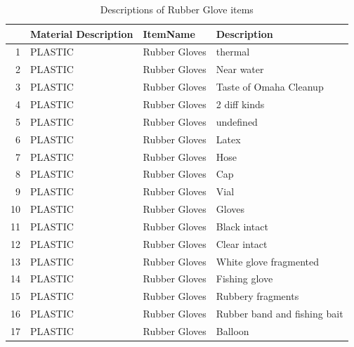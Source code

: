 \documentclass[10pt]{article}\usepackage[]{graphicx}\usepackage[]{color}
\begin{document}
\begin{table}[ht]
\centering
\begin{tabular}{rlll}
  \hline
 & Material Description & ItemName & Description \\ 
  \hline
1 & PLASTIC & Rubber Gloves & thermal \\ 
  2 & PLASTIC & Rubber Gloves & Near water \\ 
  3 & PLASTIC & Rubber Gloves & Taste of Omaha Cleanup \\ 
  4 & PLASTIC & Rubber Gloves & 2 diff kinds \\ 
  5 & PLASTIC & Rubber Gloves & undefined \\ 
  6 & PLASTIC & Rubber Gloves & Latex \\ 
  7 & PLASTIC & Rubber Gloves & Hose \\ 
  8 & PLASTIC & Rubber Gloves & Cap \\ 
  9 & PLASTIC & Rubber Gloves & Vial \\ 
  10 & PLASTIC & Rubber Gloves & Gloves \\ 
  11 & PLASTIC & Rubber Gloves & Black intact \\ 
  12 & PLASTIC & Rubber Gloves & Clear intact \\ 
  13 & PLASTIC & Rubber Gloves & White glove fragmented \\ 
  14 & PLASTIC & Rubber Gloves & Fishing glove \\ 
  15 & PLASTIC & Rubber Gloves & Rubbery fragments \\ 
  16 & PLASTIC & Rubber Gloves & Rubber band and fishing bait \\ 
  17 & PLASTIC & Rubber Gloves & Balloon \\ 
   \hline
\end{tabular}
\caption{Descriptions of Rubber Glove items} 
\label{tab:3}
\end{table}
\end{document}
